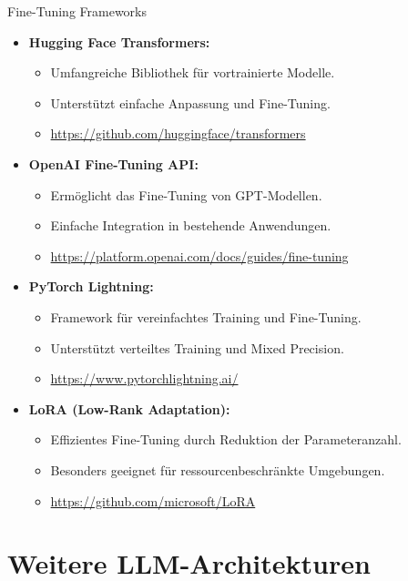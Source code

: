\documentclass[aspectratio=1610, xcolor=dvipsnames, 9pt]{beamer}
\begin{document}
\begin{frame}{Fine-Tuning Frameworks}
  \begin{itemize}
    \item \textbf{Hugging Face Transformers:}
      \begin{itemize}
        \item Umfangreiche Bibliothek für vortrainierte Modelle.
        \item Unterstützt einfache Anpassung und Fine-Tuning.
        \item \url{https://github.com/huggingface/transformers}
      \end{itemize}
    \item \textbf{OpenAI Fine-Tuning API:}
      \begin{itemize}
        \item Ermöglicht das Fine-Tuning von GPT-Modellen.
        \item Einfache Integration in bestehende Anwendungen.
        \item \url{https://platform.openai.com/docs/guides/fine-tuning}
      \end{itemize}
    \item \textbf{PyTorch Lightning:}
      \begin{itemize}
        \item Framework für vereinfachtes Training und Fine-Tuning.
        \item Unterstützt verteiltes Training und Mixed Precision.
        \item \url{https://www.pytorchlightning.ai/}
      \end{itemize}
    \item \textbf{LoRA (Low-Rank Adaptation):}
      \begin{itemize}
        \item Effizientes Fine-Tuning durch Reduktion der Parameteranzahl.
        \item Besonders geeignet für ressourcenbeschränkte Umgebungen.
        \item \url{https://github.com/microsoft/LoRA}
      \end{itemize}
  \end{itemize}
\end{frame}


\section{Weitere LLM-Architekturen}
\end{document}
